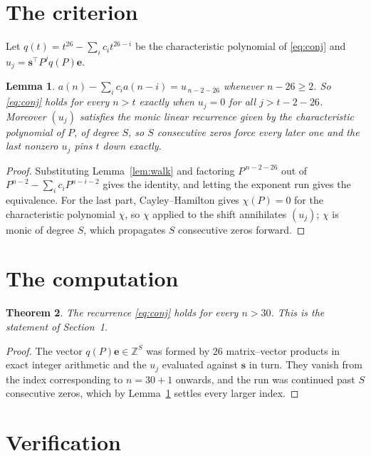 \documentclass[11pt,a4paper]{article}
\theoremstyle{plain}
\newtheorem{theorem}{Theorem}
\newtheorem{lemma}[theorem]{Lemma}
\theoremstyle{definition}
\begin{document}
\section{The criterion}

Let $q(t)=t^{26}-\sum_i c_i t^{26-i}$ be the characteristic polynomial of
\eqref{eq:conj} and $u_j=\mathbf{s}^{\!\top}P^{j}q(P)\mathbf{e}$.

\begin{lemma}\label{lem:crit}
$a(n)-\sum_i c_i a(n-i)=u_{\,n-2-26}$ whenever $n-26\ge2$. So \eqref{eq:conj}
holds for every $n>t$ exactly when $u_j=0$ for all $j>t-2-26$. Moreover $(u_j)$
satisfies the monic linear recurrence given by the characteristic polynomial of $P$, of
degree $S$, so $S$ consecutive zeros force every later one and the last nonzero $u_j$ pins
$t$ down exactly.
\end{lemma}

\begin{proof}
Substituting Lemma~\ref{lem:walk} and factoring $P^{\,n-2-26}$ out of
$P^{n-2}-\sum_i c_i P^{n-i-2}$ gives the identity, and letting the exponent run gives the
equivalence. For the last part, Cayley--Hamilton gives $\chi(P)=0$ for the characteristic
polynomial $\chi$, so $\chi$ applied to the shift annihilates $(u_j)$; $\chi$ is monic of
degree $S$, which propagates $S$ consecutive zeros forward.
\end{proof}

\section{The computation}

\begin{theorem}
The recurrence \eqref{eq:conj} holds for every $n>30$. This is the statement of
Section~1.
\end{theorem}

\begin{proof}
The vector $q(P)\mathbf{e}\in\mathbb{Z}^{S}$ was formed by $26$ matrix--vector
products in exact integer arithmetic and the $u_j$ evaluated against $\mathbf{s}$ in turn.
They vanish from the index corresponding to $n=30+1$ onwards, and the run was continued
past $S$ consecutive zeros, which by Lemma~\ref{lem:crit} settles every larger index.
\end{proof}

\section{Verification}
\end{document}
